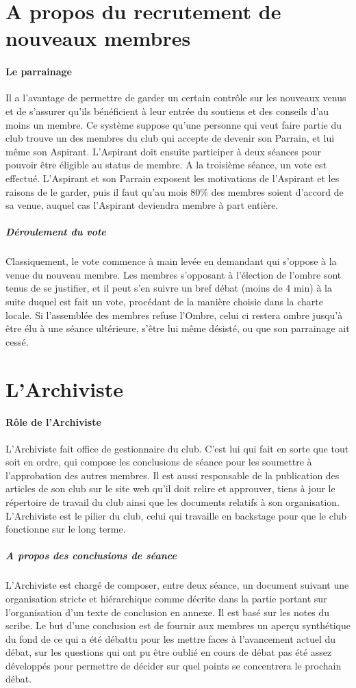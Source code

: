 \documentclass[a4paper,11pt]{article}
\begin{document}
\section{A propos du recrutement de nouveaux membres}
\paragraph{Le parrainage}
Il a l'avantage de permettre de garder un certain contrôle sur les nouveaux venus et de s'assurer qu'ils bénéficient à leur entrée du soutiens et des conseils d'au moins un membre. Ce système suppose qu'une personne qui veut faire partie du club trouve un des membres du club qui accepte de devenir son Parrain, et lui même son Aspirant. L'Aspirant doit ensuite participer à deux séances pour pouvoir être éligible au status de membre. A la troisième séance, un vote est effectué. L'Aspirant et son Parrain exposent les motivations de l'Aspirant et les raisons de le garder, puis il faut qu'au mois 80\% des membres soient d'accord de sa venue, auquel cas l'Aspirant deviendra membre à part entière.
\subparagraph{Déroulement du vote}
Classiquement, le vote commence à main levée en demandant qui s'oppose à la venue du nouveau membre. Les membres s'opposant à l'élection de l'ombre sont tenus de se justifier, et il peut s'en suivre un bref débat (moins de 4 min) à la suite duquel est fait un vote, procédant de la manière choisie dans la charte locale. Si l'assemblée des membres refuse l'Ombre, celui ci restera ombre jusqu'à être élu à une séance ultérieure, s'être lui même désisté, ou que son parrainage ait cessé.

\section{L'Archiviste}
\paragraph{Rôle de l'Archiviste}
L'Archiviste fait office de gestionnaire du club. C'est lui qui fait en sorte que tout soit en ordre, qui compose les conclusions de séance pour les soumettre à l'approbation des autres membres. Il est aussi responsable de la publication des articles de son club sur le site web qu'il doit relire et approuver, tiens à jour le répertoire de travail du club ainsi que les documents relatifs à son organisation. L'Archiviste est le pilier du club, celui qui travaille en backstage pour que le club fonctionne sur le long terme.
\subparagraph{A propos des conclusions de séance}
L'Archiviste est chargé de composer, entre deux séance, un document suivant une organisation stricte et hiérarchique comme décrite dans la partie portant sur l'organisation d'un texte de conclusion en annexe. Il est basé sur les notes du scribe. Le but d'une conclusion est de fournir aux membres un aperçu synthétique du fond de ce qui a été débattu pour les mettre faces à l'avancement actuel du débat, sur les questions qui ont pu être oublié en cours de débat pas été assez développés pour permettre de décider sur quel points se concentrera le prochain débat.
\end{document}
